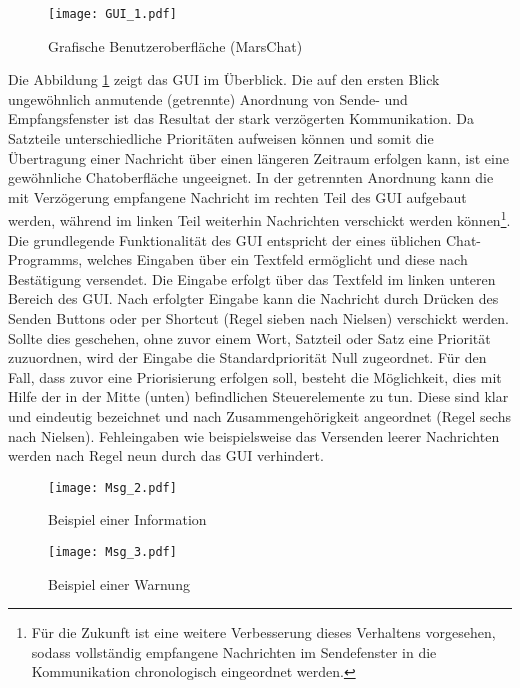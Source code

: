 \begin{figure}[H]
\centering
\texttt{[image: GUI\_1.pdf]}
\caption{Grafische Benutzeroberfläche (MarsChat)}
\label{fig:GUI}
\end{figure}

Die Abbildung \ref{fig:GUI} zeigt das \gls{GUI} im {\"U}berblick. Die auf den
ersten Blick ungew{\"o}hnlich anmutende (getrennte) Anordnung von Sende- und
Empfangsfenster ist das Resultat der stark verz{\"o}gerten Kommunikation. Da
Satzteile unterschiedliche Priorit{\"a}ten aufweisen k{\"o}nnen und somit die
{\"U}bertragung einer Nachricht {\"u}ber einen l{\"a}ngeren Zeitraum erfolgen
kann, ist eine gew{\"o}hnliche Chatoberfl{\"a}che ungeeignet. In der getrennten
Anordnung kann die mit Verz{\"o}gerung empfangene Nachricht im rechten Teil des
\gls{GUI} aufgebaut werden, w{\"a}hrend im linken Teil weiterhin Nachrichten
verschickt werden k{\"o}nnen\footnote{F{\"u}r die Zukunft ist eine weitere Verbesserung dieses
Verhaltens vorgesehen, sodass vollst{\"a}ndig empfangene Nachrichten im
Sendefenster in die Kommunikation chronologisch eingeordnet werden.}. \newline
\newline Die grundlegende Funktionalit{\"a}t des \gls{GUI} entspricht der eines
{\"u}blichen Chat-Programms, welches Eingaben {\"u}ber ein Textfeld erm{\"o}glicht und diese
nach Best{\"a}tigung versendet. Die Eingabe erfolgt {\"u}ber das Textfeld im
linken unteren Bereich des \gls{GUI}. Nach erfolgter Eingabe kann die Nachricht
durch Dr{\"u}cken des Senden Buttons oder per Shortcut (Regel sieben nach
Nielsen) verschickt werden.
Sollte dies geschehen, ohne zuvor einem Wort, Satzteil oder Satz eine
Priorit{\"a}t zuzuordnen, wird der Eingabe die Standardpriorit{\"a}t Null
zugeordnet. F{\"u}r den Fall, dass zuvor eine Priorisierung erfolgen soll,
besteht die M{\"o}glichkeit, dies mit Hilfe der in der Mitte (unten)
befindlichen Steuerelemente zu tun. Diese sind klar und eindeutig bezeichnet und nach
Zusammengeh{\"o}rigkeit angeordnet (Regel sechs nach Nielsen). Fehleingaben wie
beispielsweise das Versenden leerer Nachrichten werden nach Regel neun durch das
\gls{GUI} verhindert.

\begin{figure}[H]
\centering
\texttt{[image: Msg\_2.pdf]}
\caption{Beispiel einer Information}
\label{fig:Msg2}
\end{figure}

\begin{figure}[H]
\centering
\texttt{[image: Msg\_3.pdf]}
\caption{Beispiel einer Warnung}
\label{fig:Msg3}
\end{figure}


